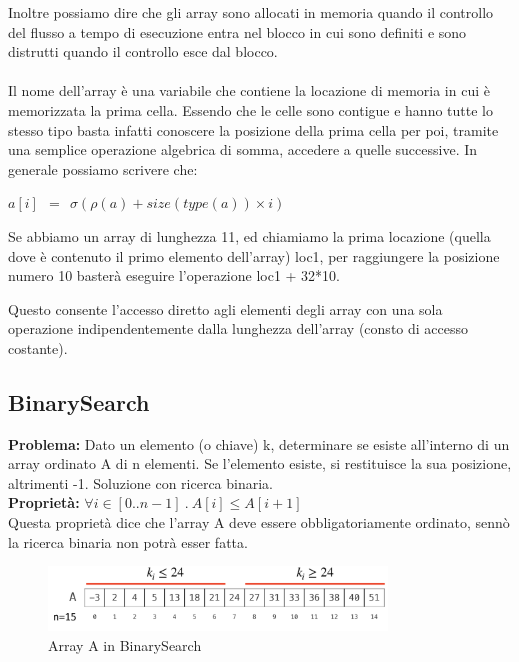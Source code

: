 Inoltre possiamo dire che gli array sono allocati in memoria quando il controllo del flusso a tempo di esecuzione entra nel blocco in cui sono definiti e sono distrutti quando il controllo esce dal blocco.\\\\
Il nome dell'array è una variabile che contiene la locazione di memoria in cui è memorizzata la prima cella. Essendo che le celle sono contigue e hanno tutte lo stesso tipo basta infatti conoscere la posizione della prima cella per poi, tramite una semplice operazione algebrica di somma, accedere a quelle successive. In generale possiamo scrivere che:
\begin{center}
    $a[i] \: \: = \: \: \sigma(\rho(a) + size(type(a)) \times i)$
\end{center}
\begin{example}
Se abbiamo un array di lunghezza 11, ed chiamiamo la prima locazione (quella dove è contenuto il primo elemento dell'array) loc1, per raggiungere la posizione numero 10 basterà eseguire l'operazione loc1 + 32*10.
\end{example}
Questo consente l'accesso diretto agli elementi degli array con una sola operazione indipendentemente dalla lunghezza dell'array (consto di accesso costante). 

\subsection{BinarySearch}
\textbf{Problema:} Dato un elemento (o chiave) k, determinare se esiste all’interno di un array ordinato A di n elementi. Se l’elemento esiste, si restituisce la sua posizione, altrimenti -1. Soluzione con ricerca binaria.\\
\textbf{Proprietà:} $\forall i \in [0..n-1] \: . \: A[i] \leq A[i+1]$\\
Questa proprietà dice che l'array A deve essere obbligatoriamente ordinato, sennò la ricerca binaria non potrà esser fatta.
\begin{figure}[h!]
    \vspace{-10pt}
    \centering
    \includegraphics[width=9cm]{images/binary-search.png}
    \vspace{-8pt}
    \caption{Array A in BinarySearch}
    \label{fig:binary-search}
\end{figure}

